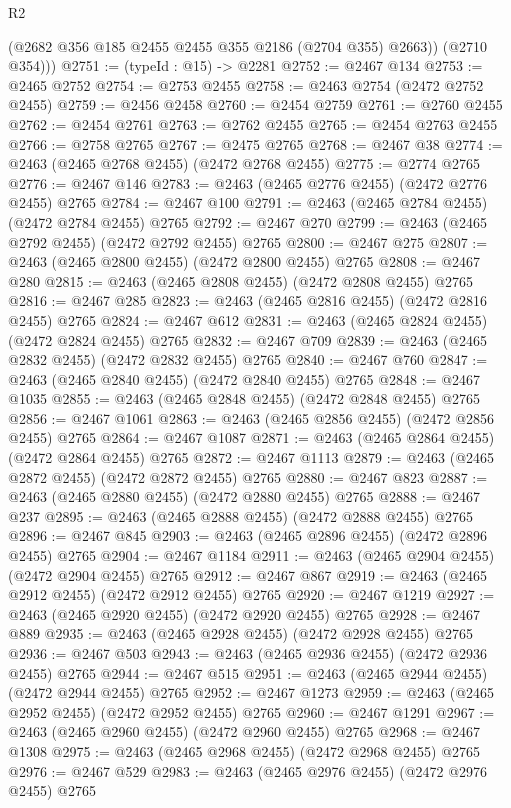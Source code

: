 \begin{lexlean}{R2}
\begin{coremodule}
          (@2682 @356 @185 @2455 @2455 @355 @2186 (@2704 @355) @2663))
        (@2710 @354)))
@2751 := (typeId : @15) -> @2281
@2752 := @2467 @134
@2753 := @2465 @2752
@2754 := @2753 @2455
@2758 := @2463 @2754 (@2472 @2752 @2455)
@2759 := @2456 @2458
@2760 := @2454 @2759
@2761 := @2760 @2455
@2762 := @2454 @2761
@2763 := @2762 @2455
@2765 := @2454 @2763 @2455
@2766 := @2758 @2765
@2767 := @2475 @2765
@2768 := @2467 @38
@2774 := @2463 (@2465 @2768 @2455) (@2472 @2768 @2455)
@2775 := @2774 @2765
@2776 := @2467 @146
@2783 := @2463 (@2465 @2776 @2455) (@2472 @2776 @2455) @2765
@2784 := @2467 @100
@2791 := @2463 (@2465 @2784 @2455) (@2472 @2784 @2455) @2765
@2792 := @2467 @270
@2799 := @2463 (@2465 @2792 @2455) (@2472 @2792 @2455) @2765
@2800 := @2467 @275
@2807 := @2463 (@2465 @2800 @2455) (@2472 @2800 @2455) @2765
@2808 := @2467 @280
@2815 := @2463 (@2465 @2808 @2455) (@2472 @2808 @2455) @2765
@2816 := @2467 @285
@2823 := @2463 (@2465 @2816 @2455) (@2472 @2816 @2455) @2765
@2824 := @2467 @612
@2831 := @2463 (@2465 @2824 @2455) (@2472 @2824 @2455) @2765
@2832 := @2467 @709
@2839 := @2463 (@2465 @2832 @2455) (@2472 @2832 @2455) @2765
@2840 := @2467 @760
@2847 := @2463 (@2465 @2840 @2455) (@2472 @2840 @2455) @2765
@2848 := @2467 @1035
@2855 := @2463 (@2465 @2848 @2455) (@2472 @2848 @2455) @2765
@2856 := @2467 @1061
@2863 := @2463 (@2465 @2856 @2455) (@2472 @2856 @2455) @2765
@2864 := @2467 @1087
@2871 := @2463 (@2465 @2864 @2455) (@2472 @2864 @2455) @2765
@2872 := @2467 @1113
@2879 := @2463 (@2465 @2872 @2455) (@2472 @2872 @2455) @2765
@2880 := @2467 @823
@2887 := @2463 (@2465 @2880 @2455) (@2472 @2880 @2455) @2765
@2888 := @2467 @237
@2895 := @2463 (@2465 @2888 @2455) (@2472 @2888 @2455) @2765
@2896 := @2467 @845
@2903 := @2463 (@2465 @2896 @2455) (@2472 @2896 @2455) @2765
@2904 := @2467 @1184
@2911 := @2463 (@2465 @2904 @2455) (@2472 @2904 @2455) @2765
@2912 := @2467 @867
@2919 := @2463 (@2465 @2912 @2455) (@2472 @2912 @2455) @2765
@2920 := @2467 @1219
@2927 := @2463 (@2465 @2920 @2455) (@2472 @2920 @2455) @2765
@2928 := @2467 @889
@2935 := @2463 (@2465 @2928 @2455) (@2472 @2928 @2455) @2765
@2936 := @2467 @503
@2943 := @2463 (@2465 @2936 @2455) (@2472 @2936 @2455) @2765
@2944 := @2467 @515
@2951 := @2463 (@2465 @2944 @2455) (@2472 @2944 @2455) @2765
@2952 := @2467 @1273
@2959 := @2463 (@2465 @2952 @2455) (@2472 @2952 @2455) @2765
@2960 := @2467 @1291
@2967 := @2463 (@2465 @2960 @2455) (@2472 @2960 @2455) @2765
@2968 := @2467 @1308
@2975 := @2463 (@2465 @2968 @2455) (@2472 @2968 @2455) @2765
@2976 := @2467 @529
@2983 := @2463 (@2465 @2976 @2455) (@2472 @2976 @2455) @2765

\end{coremodule}
\end{lexlean}
